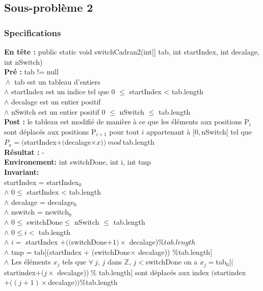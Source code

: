 \subsection{Sous-problème 2}

\subsubsection*{Specifications}
\noindent \textbf{En tête :} public static void switchCadran2(int[] tab, int startIndex, int decalage, int nSwitch)\\
\noindent \textbf{Pré : } tab != null \\
 	  \indent \indent $\dot{\wedge}$ tab est un tableau d'entiers\\
	  \indent \indent $\wedge$ startIndex est un indice tel que 0 $\leq$ startIndex < tab.length \\
	  \indent \indent $\wedge$ decalage est un entier positif \\
	  \indent \indent $\wedge$ nSwitch est un entier positif 0 $\leq$ nSwitch $\leq$ tab.length\\
\textbf{Post :}  le tableau est modifié de manière à ce que les éléments aux positions P$_{i}$ sont déplacés aux positions P$_{i+1}$ pour tout $i$ appartenant à $[0,$nSwitch$[$ tel que $P_{x} = ($startIndex$ + ($decalage$\times x))\ mod\ $tab.length\\
\textbf{Résultat :}  - \\
\textbf{Environement: } int switchDone, int i, int tmp\\

\noindent \textbf{Invariant:}\\
\noindent startIndex = startIndex$_{0}$\\
$\wedge$ $0 \leq$ startIndex < tab.length \\
$\wedge$ decalage = decalage$_{0}$\\
$\wedge$ nswitch = nswitch$_{0}$\\
$\wedge$ $0\leq$ switchDone$ \leq$ nSwitch $\leq$ tab.length\\
$\wedge$ $0\leq i <$ tab.length\\
$\wedge$ $i =$ startIndex $+ (($switchDone$+1)\times$ decalage)$ \% tab.length$\\
$\wedge$ tmp = tab[(startIndex $+$ (switchDone$\times$ decalage))  $\% $tab.length$]$\\
$\wedge$ Les éléments $x_{j}$ tels que $\forall\ j$, $j$ dans $\mathbb{Z}$, $j<$switchDone on a $x_{j}=$tab$_{0}[($startindex$ + (j\times$ decalage))$\ \%$ tab.length$]$ sont déplacés aux index $($startindex$ + ((j+1)\times  $decalage$))\% $tab.length\\

